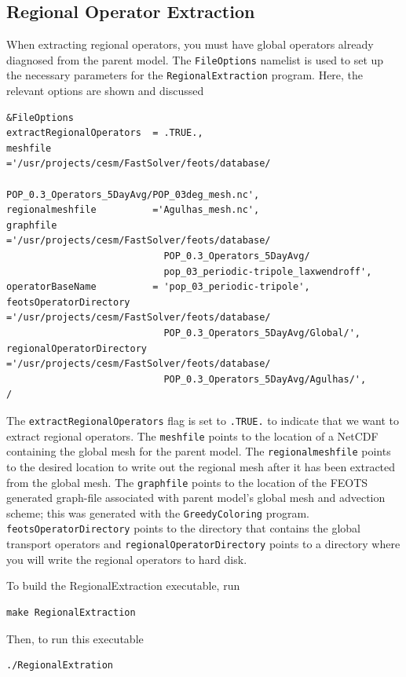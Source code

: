 \documentclass{softwaremanual}
\begin{document}
\subsection{Regional Operator Extraction}
When extracting regional operators, you must have global operators already diagnosed from the parent model. The \texttt{FileOptions} namelist is used to set up the necessary parameters for the \texttt{RegionalExtraction} program. Here, the relevant options are shown and discussed
\begin{verbatim}
&FileOptions
extractRegionalOperators  = .TRUE.,
meshfile                  ='/usr/projects/cesm/FastSolver/feots/database/
                            POP_0.3_Operators_5DayAvg/POP_03deg_mesh.nc',
regionalmeshfile          ='Agulhas_mesh.nc', 
graphfile                 ='/usr/projects/cesm/FastSolver/feots/database/
                            POP_0.3_Operators_5DayAvg/
                            pop_03_periodic-tripole_laxwendroff',
operatorBaseName          = 'pop_03_periodic-tripole',
feotsOperatorDirectory    ='/usr/projects/cesm/FastSolver/feots/database/
                            POP_0.3_Operators_5DayAvg/Global/',
regionalOperatorDirectory ='/usr/projects/cesm/FastSolver/feots/database/
                            POP_0.3_Operators_5DayAvg/Agulhas/',
/
\end{verbatim}
The \texttt{extractRegionalOperators} flag is set to \texttt{.TRUE.} to indicate that we want to extract regional operators. The \texttt{meshfile} points to the location of a NetCDF containing the global mesh for the parent model. The \texttt{regionalmeshfile} points to the desired location to write out the regional mesh after it has been extracted from the global mesh. The \texttt{graphfile} points to the location of the FEOTS generated graph-file associated with parent model's global mesh and advection scheme; this was generated with the \texttt{GreedyColoring} program. \texttt{feotsOperatorDirectory} points to the directory that contains the global transport operators and \texttt{regionalOperatorDirectory} points to a directory where you will write the regional operators to hard disk. 

To build the RegionalExtraction executable, run
\begin{verbatim}
make RegionalExtraction
\end{verbatim}
Then, to run this executable
\begin{verbatim}
./RegionalExtration
\end{verbatim}
\end{document}
